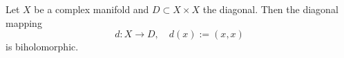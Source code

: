 Let $X$ be a complex manifold and $D \subset X \times X$ the diagonal. Then the diagonal mapping
$$d: X \to D, \quad d(x) := (x, x)$$
is biholomorphic.
